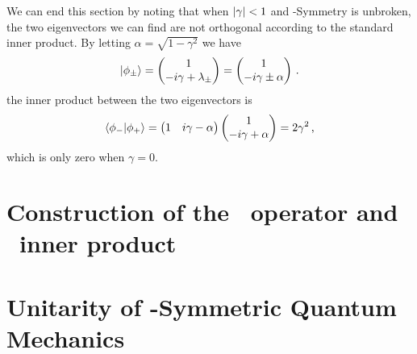         We can end this section by noting that when $\abs{\gamma} < 1$ and \PT-Symmetry is unbroken, the two eigenvectors we can find are not orthogonal according to the standard inner product. By letting $\alpha = \sqrt{1 - \gamma^2}$ we have 
        \begin{equation*}
            \ket{\phi_\pm} = \pmqty{1 \\ -i\gamma + \lambda_\pm} = \pmqty{1 \\ -i\gamma \pm \alpha}
            \myperiod
        \end{equation*}
        the inner product between the two eigenvectors is
        \begin{equation*}
            \bra{\phi_-}\ket{\phi_+} = \pmqty{1 & i\gamma - \alpha}\pmqty{1 \\ -i\gamma + \alpha} = 2 \gamma^2
            \mycomma
        \end{equation*}
        which is only zero when $\gamma = 0$.

    \section{Construction of the \hC\ operator and \CPT\ inner product}
    \section{Unitarity of \PT-Symmetric Quantum Mechanics}